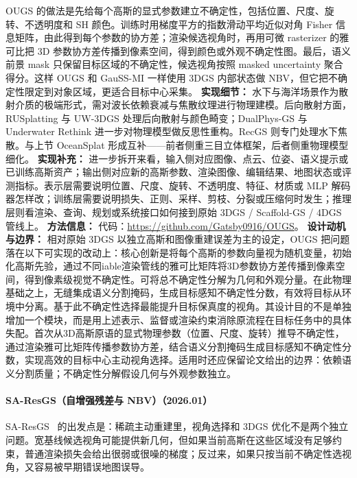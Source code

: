 OUGS 的做法是先给每个高斯的显式参数建立不确定性，包括位置、尺度、旋转、不透明度和 SH 颜色。训练时用梯度平方的指数滑动平均近似对角 Fisher 信息矩阵，由此得到每个参数的协方差；渲染候选视角时，再用可微 rasterizer 的雅可比把 3D 参数协方差传播到像素空间，得到颜色或外观不确定性图。最后，语义前景 mask 只保留目标区域的不确定性，候选视角按照 masked uncertainty 聚合得分。这样 OUGS 和 GauSS-MI 一样使用 3DGS 内部状态做 NBV，但它把不确定性限定到对象区域，更适合目标中心采集。
\textbf{实现细节：} 水下与海洋场景作为散射介质的极端形式，需对波长依赖衰减与焦散纹理进行物理建模。后向散射方面，RUSplatting 与 UW-3DGS 处理后向散射与颜色畸变；DualPhys-GS 与 Underwater Rethink 进一步对物理模型做反思性重构。RecGS 则专门处理水下焦散。与上节 OceanSplat 形成互补——前者侧重三目立体框架，后者侧重物理模型细化。
\textbf{实现补充：} 进一步拆开来看，输入侧对应图像、点云、位姿、语义提示或已训练高斯资产；输出侧对应新的高斯参数、渲染图像、编辑结果、地图状态或评测指标。表示层需要说明位置、尺度、旋转、不透明度、特征、材质或 MLP 解码器怎样改；训练层需要说明损失、正则、采样、剪枝、分裂或压缩何时发生；推理层则看渲染、查询、规划或系统接口如何接到原始 3DGS / Scaffold-GS / 4DGS 管线上。
\textbf{方法信息：} 代码：\url{https://github.com/Gatsby0916/OUGS}。
\textbf{设计动机与边界：} 相对原始 3DGS 以独立高斯和图像重建误差为主的设定，OUGS 把问题落在以下可实现的改动上：核心创新是将每个高斯的参数向量视为随机变量，初始化高斯先验，通过不同iable渲染管线的雅可比矩阵将3D参数协方差传播到像素空间，得到像素级视觉不确定性。可将总不确定性分解为几何和外观分量。在此物理基础之上，无缝集成语义分割掩码，生成目标感知不确定性分数，有效将目标从环境中分离。基于此不确定性选择最能提升目标保真度的视角。其设计目的不是单独增加一个模块，而是用上述表示、监督或渲染约束消除原流程在目标任务中的具体失配。首次从3D高斯原语的显式物理参数（位置、尺度、旋转）推导不确定性，通过渲染雅可比矩阵传播参数协方差，结合语义分割掩码生成目标感知不确定性分数，实现高效的目标中心主动视角选择。适用时还应保留论文给出的边界：依赖语义分割质量；不确定性分解假设几何与外观参数独立。
\paragraph{SA-ResGS（自增强残差与 NBV）（2026.01）}
SA-ResGS~\cite{2601_03024} 的出发点是：稀疏主动重建里，视角选择和 3DGS 优化不是两个独立问题。宽基线候选视角可能提供新几何，但如果当前高斯在这些区域没有足够约束，普通渲染损失会给出很弱或很噪的梯度；反过来，如果只按当前不确定性选视角，又容易被早期错误地图误导。


